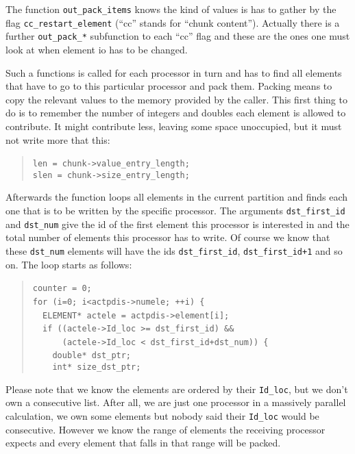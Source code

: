 The function \texttt{out{\_}pack{\_}items} knows the kind of values
is has to gather by the flag \texttt{cc{\_}restart{\_}element}
({}``cc'' stands for {}``chunk content''). Actually there is a
further \texttt{out{\_}pack{\_}{*}} subfunction to each {}``cc''
flag and these are the ones one must look at when element io has to
be changed.

Such a functions is called for each processor in turn and has to find
all elements that have to go to this particular processor and pack
them. Packing means to copy the relevant values to the memory provided
by the caller. This first thing to do is to remember the number of
integers and doubles each element is allowed to contribute. It might
contribute less, leaving some space unoccupied, but it must not write
more that this: 

\begin{quote}
\texttt{len~=~chunk->value{\_}entry{\_}length;~}~\\
 \texttt{slen~=~chunk->size{\_}entry{\_}length; }
\end{quote}
Afterwards the function loops all elements in the current partition
and finds each one that is to be written by the specific processor.
The arguments \texttt{dst{\_}first{\_}id} and \texttt{dst{\_}num}
give the id of the first element this processor is interested in and
the total number of elements this processor has to write. Of course
we know that these \texttt{dst{\_}num} elements will have the ids
\texttt{dst{\_}first{\_}id}, \texttt{dst{\_}first{\_}id+1}
and so on. The loop starts as follows: 

\begin{quote}
\texttt{counter~=~0;~}~\\
 \texttt{for~(i=0;~i<actpdis->numele;~++i)~{\{}~}~\\
 \texttt{~~ELEMENT{*}~actele~=~actpdis->element{[}i];~}~\\
 \texttt{~~if~((actele->Id{\_}loc~>=~dst{\_}first{\_}id)~{\&}{\&}~}~\\
 \texttt{~~~~~~(actele->Id{\_}loc~<~dst{\_}first{\_}id+dst{\_}num))~{\{}~}~\\
 \texttt{~~~~double{*}~dst{\_}ptr;~}~\\
 \texttt{~~~~int{*}~size{\_}dst{\_}ptr; }
\end{quote}
Please note that we know the elements are ordered by their \texttt{Id{\_}loc},
but we don't own a consecutive list. After all, we are just one processor
in a massively parallel calculation, we own some elements but nobody
said their \texttt{Id{\_}loc} would be consecutive. However we know
the range of elements the receiving processor expects and every element
that falls in that range will be packed.

